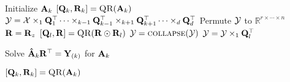
\begin{algorithmic}[1]
      \State Initialize $\mat{A}_k$
      \State $[\mat{Q}_k,\mat{R}_k] = \Call{QR}{\mat{A}_k}$ 
      \EndFor
        \State $\T{Y} =  \T{X} \times_1 \mat{Q}_1^\top \dots \times_{k-1} \mat{Q}_{k-1}^\top \times_{k+1} \mat{Q}_{k+1}^\top \dots \times_d \mat{Q}_d^\top$ \label{l:Pair-TTM} 
        \State Permute $\T[]{Y}$ to $\mathbb{R}^{r \times \cdots \times n}$
        \State {} 
        \State $\mat{R} = \mat{R}_z$
         
        \State $[\mat{Q}_l,\mat{R}] = \Call{QR}{\mat{R} \odot \mat{R}_l}$
        \State $\T{Y}= \Call{collapse}{\T{Y}}$
        \State $\T[]{Y} = \T[]{Y} \times_1 \mat{Q}_l^\top$  \label{l:pair-R-TTM}

        \EndFor
              
      \State Solve $  \mat{\hat{A}}_k\mat{R}^\top = \mat{Y}_{(k)}$ for $\mat{A}_k$ 
      
      \State $[\mat{Q}_k,\mat{R}_k] = \Call{QR}{\mat{A}_k}$   
      \EndFor
      \EndWhile
    \EndFunction
  \end{algorithmic}